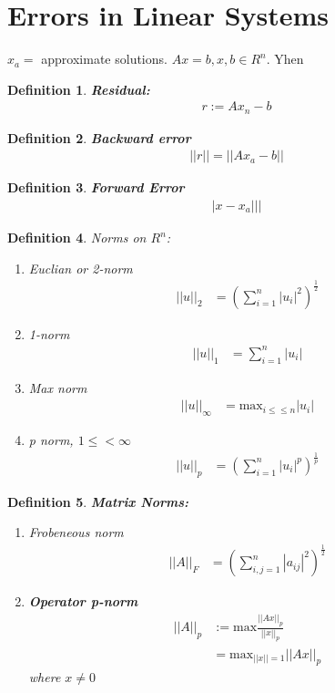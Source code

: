 \documentclass[11pt,oneside]{book}
\theoremstyle{break}
\theoremstyle{break}
\newtheorem{defn}{Definition}[corL]
\begin{document}
\section[Errors in Linear Systems]{Errors in Linear Systems}
$x_a=$ approximate solutions. $Ax=b, x,b\in R^n.$ Yhen \begin{defn}
\textbf{Residual:}\begin{align*}
r:=Ax_n-b
\end{align*}
\end{defn}
\begin{defn}
\textbf{Backward error}\begin{align*}
||r||=||Ax_a-b||
\end{align*}
\end{defn}
\begin{defn}
\textbf{Forward Error}\begin{align*}
|x-x_a|||
\end{align*}
\end{defn}
\begin{defn}
Norms on $R^n$:\begin{enumerate}
\item Euclian or 2-norm \begin{align*}
||u||_2&=\left(\sum_{i=1}^n|u_i|^2 \right)^{\frac{1}{2}}
\end{align*}
\item 1-norm \begin{align*}
||u||_1&=\sum_{i=1}^n|u_i|
\end{align*}
\item Max norm \begin{align*}
||u||_{\infty}&=\text{max}_{i\leq \leq n}|u_i|
\end{align*}
\item p norm, $1\leq <\infty$\begin{align*}
||u||_p&=\left(\sum_{i=1}^n|u_i|^p \right)^{\frac{1}{p}}
\end{align*}
\end{enumerate}
\end{defn}
\begin{defn}
\textbf{Matrix Norms:}\begin{enumerate}
\item Frobeneous norm\begin{align*}
||A||_F&=\left(\sum_{i,j=1}^n |a_{ij}|^2 \right)^{\frac{1}{2}}
\end{align*}
\item \textbf{Operator p-norm}\begin{align*}
||A||_p&:=\text{max} \frac{||Ax||_p}{||x||_p}\\
&=\text{max}_{||x||=1}||Ax||_p
\end{align*}
where $x\neq 0$
\end{enumerate}
\end{defn}
\end{document}

